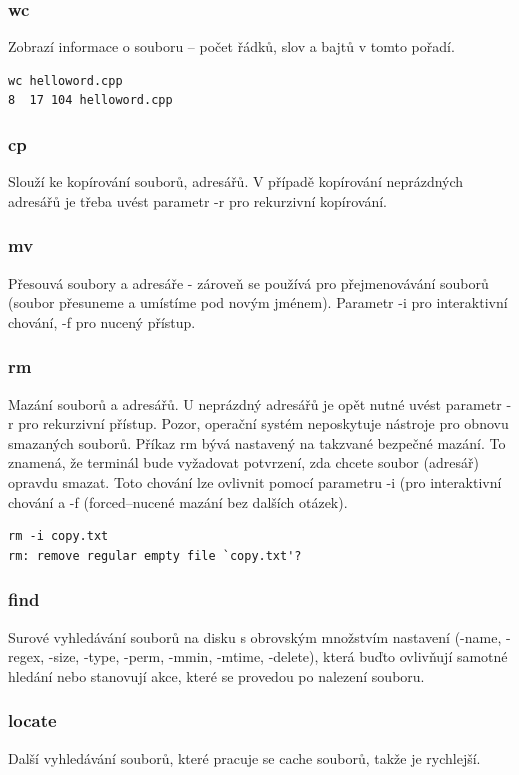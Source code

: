 \documentclass{article}
\begin{document}
\subsubsection{wc}
Zobrazí informace o souboru -- počet řádků, slov a bajtů v tomto pořadí.
\begin{verbatim}
wc helloword.cpp
8  17 104 helloword.cpp
\end{verbatim}

\subsubsection{cp}
Slouží ke kopírování souborů, adresářů. V případě kopírování neprázdných adresářů je třeba uvést parametr -r pro rekurzivní kopírování.

\subsubsection{mv}
Přesouvá soubory a adresáře - zároveň se používá pro přejmenovávání souborů (soubor přesuneme a umístíme pod novým jménem). Parametr -i pro interaktivní chování, -f pro nucený přístup.

\subsubsection{rm}
Mazání souborů a adresářů. U neprázdný adresářů je opět nutné uvést parametr -r pro rekurzivní přístup. Pozor, operační systém neposkytuje nástroje pro obnovu smazaných souborů. Příkaz rm bývá nastavený na takzvané bezpečné mazání. To znamená, že terminál bude vyžadovat potvrzení, zda chcete soubor (adresář) opravdu smazat. Toto chování lze ovlivnit pomocí parametru -i (pro interaktivní chování a -f (forced--nucené mazání bez dalších otázek).

\begin{verbatim}
rm -i copy.txt
rm: remove regular empty file `copy.txt'? 
\end{verbatim}

\subsubsection{find}
Surové vyhledávání souborů na disku s obrovským množstvím nastavení (-name, -regex, -size, -type, -perm, -mmin, -mtime, -delete), která buďto ovlivňují samotné hledání nebo stanovují akce, které se provedou po nalezení souboru.

\subsubsection{locate}
Další vyhledávání souborů, které pracuje se cache souborů, takže je rychlejší.
\end{document}
